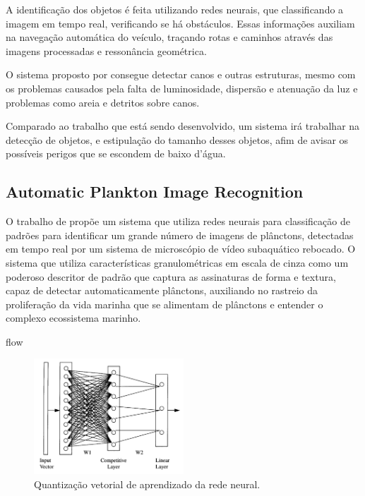 A identificação dos objetos é feita utilizando redes neurais, que classificando a imagem em tempo real, verificando se há obstáculos. Essas informações auxiliam na navegação automática do veículo, traçando rotas e caminhos através das imagens processadas e ressonância geométrica.

O sistema proposto por  consegue detectar canos e outras estruturas, mesmo com os problemas causados pela falta de luminosidade, dispersão e atenuação da luz e problemas como areia e detritos sobre canos.

Comparado ao trabalho que está sendo desenvolvido, um sistema irá trabalhar na detecção de objetos, e estipulação do tamanho desses objetos, afim de avisar os possíveis perigos que se escondem de baixo d'água.

\subsection{Automatic Plankton Image Recognition}

O trabalho de  propõe um sistema que utiliza redes neurais para classificação de  padrões para identificar um grande número de imagens de plânctons, detectadas em tempo real por um sistema de microscópio de vídeo subaquático rebocado. O sistema que utiliza características granulométricas em escala de cinza como um poderoso descritor de padrão que captura as assinaturas de forma e textura, capaz de detectar automaticamente plânctons, auxiliando no rastreio da proliferação da vida marinha que se alimentam de plânctons e entender o complexo ecossistema marinho.

flow\begin{figure}[h]
	\caption{\label{fig:tangnet} Quantização vetorial de aprendizado da rede neural.}
	\begin{center}
	    \includegraphics[width=0.5\textwidth]{resources/neuralnet}
	\end{center}
\end{figure}

